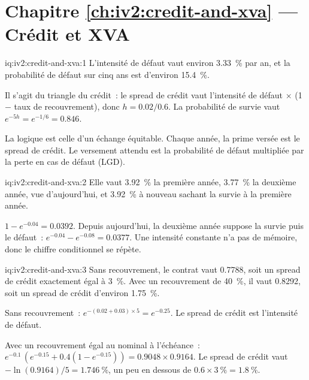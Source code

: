\section*{Chapitre \ref{ch:iv2:credit-and-xva} --- Crédit et XVA}

\begin{solution}{iq:iv2:credit-and-xva:1}
L'intensité de défaut vaut environ 3.33~\% par an, et la probabilité de défaut sur cinq ans est d'environ 15.4~\%.

Il s'agit du triangle du crédit~: le spread de crédit vaut l'intensité de défaut $\times$ (1 $-$ taux de recouvrement), donc $h = 0.02/0.6$. La probabilité de survie vaut $e^{-5h} = e^{-1/6} = 0.846$.

La logique est celle d'un échange équitable. Chaque année, la prime versée est le spread de crédit. Le versement attendu est la probabilité de défaut multipliée par la perte en cas de défaut (LGD).

\end{solution}

\begin{solution}{iq:iv2:credit-and-xva:2}
Elle vaut 3.92~\% la première année, 3.77~\% la deuxième année, vue d'aujourd'hui, et 3.92~\% à nouveau sachant la survie à la première année.

$1 - e^{-0.04} = 0.0392$. Depuis aujourd'hui, la deuxième année suppose la survie puis le défaut~: $e^{-0.04} - e^{-0.08} = 0.0377$. Une intensité constante n'a pas de mémoire, donc le chiffre conditionnel se répète.

\end{solution}

\begin{solution}{iq:iv2:credit-and-xva:3}
Sans recouvrement, le contrat vaut 0.7788, soit un spread de crédit exactement égal à 3~\%. Avec un recouvrement de 40~\%, il vaut 0.8292, soit un spread de crédit d'environ 1.75~\%.

Sans recouvrement~: $e^{-(0.02 + 0.03) \times 5} = e^{-0.25}$. Le spread de crédit est l'intensité de défaut.

Avec un recouvrement égal au nominal à l'échéance~: $e^{-0.1}\,(e^{-0.15} + 0.4(1 - e^{-0.15})) = 0.9048 \times 0.9164$. Le spread de crédit vaut $-\ln(0.9164)/5 = 1.746~\%$, un peu en dessous de $0.6 \times 3~\% = 1.8~\%$.

\end{solution}

